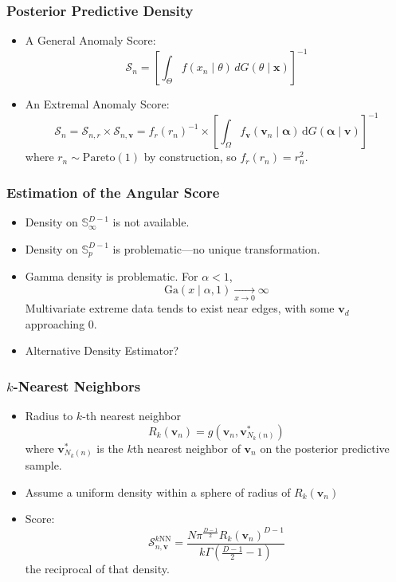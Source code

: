 \documentclass[aspectratio=169,10pt]{beamer}
\begin{document}
\begin{frame}
    \frametitle{Posterior Predictive Density}
    \begin{itemize}
        \item A General Anomaly Score:
        \[
            \mathcal{S}_n = \left[\int_{\Theta}f(x_n\mid\theta)\,dG(\theta\mid\bm{x})\right]^{-1}
        \]
        \item An Extremal Anomaly Score:
        \[
            \mathcal{S}_n = \mathcal{S}_{n,r} \times \mathcal{S}_{n,\bm{v}}
                = f_r(r_n)^{-1}\times \left[\int_{\Omega}f_{\bm{v}}(\bm{v}_n\mid\bm{\alpha})\,\text{d}G(\bm{\alpha}\mid\bm{v})\right]^{-1}
        \]
        where $r_n\sim\text{Pareto}(1)$ by construction, so $f_r(r_n) = r_n^2$.
    \end{itemize}
\end{frame} %

\begin{frame}
    \frametitle{Estimation of the Angular Score}
    \begin{itemize}
        \item Density on $\mathbb{S}_{\infty}^{D-1}$ is not available.
        \item Density on $\mathbb{S}_p^{D-1}$ is problematic---no unique transformation.
        \item Gamma density is problematic.  For 
            $\alpha < 1$, \[\text{Ga}(x\mid\alpha, 1) \xrightarrow[x\to0]{} \infty\]
        Multivariate extreme data tends to exist near edges, with some $\bm{v}_d$ approaching 0.
        \item Alternative Density Estimator?
    \end{itemize}
\end{frame} %

\begin{frame}
    \frametitle{$k$-Nearest Neighbors}
    \begin{itemize}
        \item Radius to $k$-th nearest neighbor
        \[
            R_k(\bm{v}_n) = g\left(\bm{v}_n,\bm{v}_{N_k(n)}^*\right)
        \]
        where $\bm{v}_{N_k(n)}^*$ is the $k$th nearest neighbor of $\bm{v}_n$ on the posterior predictive sample.
        \item Assume a uniform density within a sphere of radius of $R_k(\bm{v}_n)$
        \item Score:
        \[
            \mathcal{S}_{n,\bm{v}}^{\text{$k$NN}} = \frac{N\pi^{\frac{D-1}{2}}R_k(\bm{v}_n)^{D-1}}{k\Gamma(\frac{D-1}{2} - 1)}
        \]
        the reciprocal of that density.
    \end{itemize}
\end{frame} %
\end{document}

